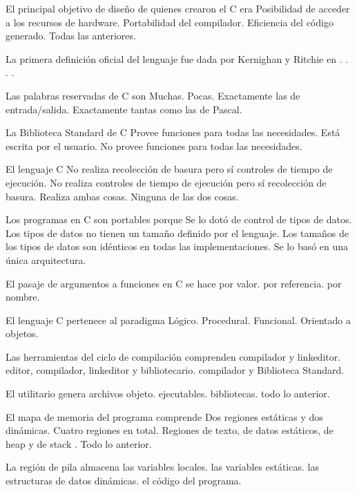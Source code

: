 
\begin{preguntas}
\label{sec:tc-introduccion-preg}
\question El principal objetivo de diseño de quienes crearon el C era
\choice Posibilidad de acceder a los recursos de hardware.
\choice Portabilidad del compilador.
\choice Eficiencia del código generado.
\correctchoice Todas las anteriores.

\question La primera definición oficial del lenguaje fue dada por Kernighan y Ritchie en
.
.
.
.

\question Las palabras reservadas de C son
\choice Muchas.
\correctchoice Pocas.
\choice Exactamente las de entrada/salida.
\choice Exactamente tantas como las de Pascal.

\question La Biblioteca Standard de C
\choice Provee funciones para todas las necesidades.
\choice Está escrita por el usuario.
\correctchoice No provee funciones para todas las necesidades.

\question El lenguaje C
\choice No realiza recolección de basura pero sí controles de tiempo de ejecución.
\choice No realiza controles de tiempo de ejecución pero sí recolección de basura.
\choice Realiza ambas cosas.
\correctchoice Ninguna de las dos cosas.

\question Los programas en C son portables porque
\choice Se lo dotó de control de tipos de datos.
\correctchoice Los tipos de datos no tienen un tamaño definido por el lenguaje.
\choice Los tamaños de los tipos de datos son idénticos en todas las implementaciones.
\choice Se lo basó en una única arquitectura.

\question El pasaje de argumentos a funciones en C se hace
\correctchoice por valor.
\choice por referencia.
\choice por nombre.

\question El lenguaje C pertenece al paradigma
\choice Lógico.
\correctchoice Procedural.
\choice Funcional.
\choice Orientado a objetos.

\question Las herramientas del ciclo de compilación comprenden
\choice compilador y linkeditor.
\correctchoice editor, compilador, linkeditor y bibliotecario.
\choice compilador y Biblioteca Standard.

\question El utilitario  genera
\choice archivos objeto.
\choice ejecutables.
\choice bibliotecas.
\correctchoice todo lo anterior.

\question El mapa de memoria del programa comprende
\choice Dos regiones estáticas y dos dinámicas.
\choice Cuatro regiones en total.
\choice Regiones de texto, de datos estáticos, de heap y de stack .
\correctchoice Todo lo anterior.

\question La región de pila almacena
\correctchoice las variables locales.
\choice las variables estáticas.
\choice las estructuras de datos dinámicas.
\choice el código del programa.
\end{preguntas}
